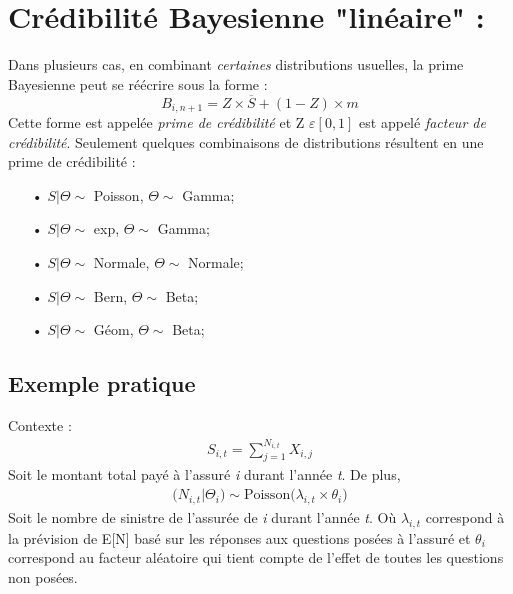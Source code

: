 \documentclass[11pt,french]{report}
\begin{document}
\section{Crédibilité Bayesienne "linéaire" :}
Dans plusieurs cas, en combinant \emph{certaines} distributions usuelles, la prime Bayesienne peut se réécrire sous la forme :
\begin{equation}
\label{equa:bayesienne}
B_{i,n+1} = Z \times \overline{S} + (1 - Z) \times m
\end{equation}
Cette forme est appelée \emph{prime de crédibilité} et Z $\varepsilon[0,1]$ est appelé \emph{facteur de crédibilité}.
Seulement quelques combinaisons de distributions résultent en une prime de crédibilité :
\begin{itemize}
\item[•] $S|\Theta \sim$ Poisson, $\Theta \sim$ Gamma;
\item[•] $S|\Theta \sim$ exp, $\Theta \sim$ Gamma;
\item[•] $S|\Theta \sim$ Normale, $\Theta \sim$ Normale;
\item[•] $S|\Theta \sim$ Bern, $\Theta \sim$ Beta;
\item[•] $S|\Theta \sim$ Géom, $\Theta \sim$ Beta;
\end{itemize}

\subsection*{Exemple pratique}
Contexte : 
\begin{align*}
S_{i,t} = \sum_{j = 1}^{N_{i,t}} X_{i,j} 
\end{align*}
Soit le montant total payé à l'assuré \textit{i} durant l'année \textit{t}. 
De plus,
\begin{align*}
\Bigg( N_{i,t}|\Theta_i \Bigg) \sim \text{Poisson} \Big( \lambda_{i,t} \times \theta_i \Big)
\end{align*}
Soit le nombre de sinistre de l'assurée de \textit{i} durant l'année \textit{t}. Où $\lambda_{i,t}$ correspond à la prévision de E[N] basé sur les réponses aux questions posées à l'assuré et $\theta_i$ correspond au facteur aléatoire qui tient compte de l'effet de toutes les questions non posées.
\end{document}
